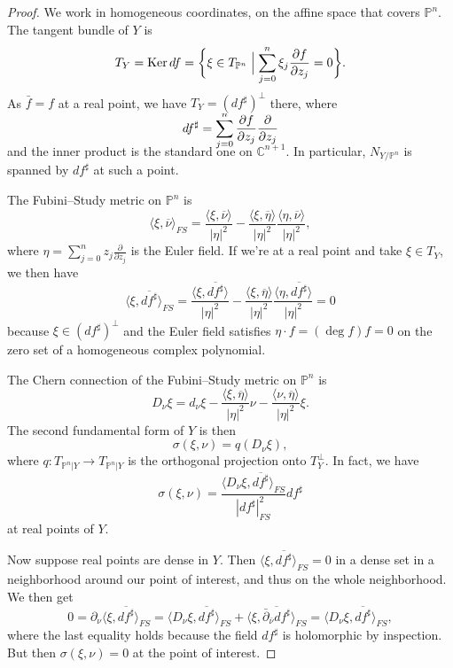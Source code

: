 \documentclass[11pt]{article}
\theoremstyle{definition}
\newcommand{\kk}[1]{\mathbb{#1}}
\def\ov#1{\overline{#1}}
\DeclareMathOperator{\Ker}{Ker}
\begin{document}
\begin{proof}
We work in homogeneous coordinates, on the affine space that covers $\kk P^{n}$.
The tangent bundle of $Y$ is
\[
  T_{Y} = \Ker df
  = \biggl\{
  \xi \in T_{\kk P^{n}}
  \Bigm| \sum_{j=0}^{n} \xi_{j} \frac{\partial f}{\partial z_{j}} = 0
  \biggr\}.
\]
As $\bar f = f$ at a real point, we have $T_{Y} = (df^{\sharp})^{\perp}$ there,
where
$$
df^{\sharp} =
\smash{\sum_{j=0}^{n} \frac{\partial f}{\partial z_{j}} \frac{\partial}{\partial z_{j}}}
$$
and the inner product is the standard one on $\kk C^{n+1}$.
In particular, $N_{Y/\kk P^{n}}$ is spanned by $df^{\sharp}$ at such a point.

The Fubini--Study metric on $\kk P^{n}$ is
\[
  \langle \xi, \ov\nu \rangle_{FS}
  = \frac{\langle \xi, \ov\nu \rangle}{|\eta|^{2}}
  - \frac{\langle \xi, \ov\eta \rangle}{|\eta|^{2}}
  \frac{\langle \eta, \ov\nu \rangle}{|\eta|^{2}},
\]
where $\eta = \sum_{j=0}^{n} z_{j} \frac{\partial}{\partial z_{j}}$ is the Euler field.
If we're at a real point and take $\xi \in T_{Y}$, we then have
\[
  \langle \xi, \ov{df^{\sharp}} \rangle_{FS}
  = \frac{\langle \xi, \ov{df^{\sharp}} \rangle}{|\eta|^{2}}
  - \frac{\langle \xi, \ov\eta \rangle}{|\eta|^{2}}
  \frac{\langle \eta, \ov{df^{\sharp}} \rangle}{|\eta|^{2}}
  = 0
\]
because $\xi \in (df^{\sharp})^{\perp}$ and the Euler field satisfies $\eta \cdot f = (\deg f) f = 0$ on the zero set of a homogeneous complex polynomial.

The Chern connection of the Fubini--Study metric on $\kk P^{n}$ is
\[
  D_{\nu} \xi = d_{\nu}\xi
  - \frac{\langle \xi, \ov\eta\rangle}{|\eta|^{2}} \nu
  - \frac{\langle \nu, \ov\eta\rangle}{|\eta|^{2}} \xi.
\]
The second fundamental form of $Y$ is then
\[
  \sigma(\xi, \nu)
  = q(D_{\nu}\xi),
\]
where $q : T_{\kk P^{n}|Y} \to T_{\kk P^{n}|Y}$ is the orthogonal projection onto $T_{Y}^{\perp}$.
In fact, we have
\[
  \sigma(\xi, \nu)
  = \frac{\langle D_{\nu} \xi, \ov{df^{\sharp}} \rangle_{FS}}{|df^{\sharp}|_{FS}^{2}} df^{\sharp}
\]
at real points of $Y$.

Now suppose real points are dense in $Y$.
Then $\langle \xi, \ov{df^{\sharp}} \rangle_{FS} = 0$ in a dense set in a neighborhood around our point of interest, and thus on the whole neighborhood.
We then get
\[
  0 = \partial_{\nu} \langle \xi, \ov{df^{\sharp}} \rangle_{FS}
  = \langle D_{\nu}\xi,  \ov{df^{\sharp}} \rangle_{FS}
  + \langle \xi,  \ov{\bar\partial_{\ov\nu}df^{\sharp}} \rangle_{FS}
  = \langle D_{\nu}\xi,  \ov{df^{\sharp}} \rangle_{FS},
\]
where the last equality holds because the field $df^{\sharp}$ is holomorphic by inspection.
But then $\sigma(\xi, \nu) = 0$ at the point of interest.
\end{proof}
\end{document}
